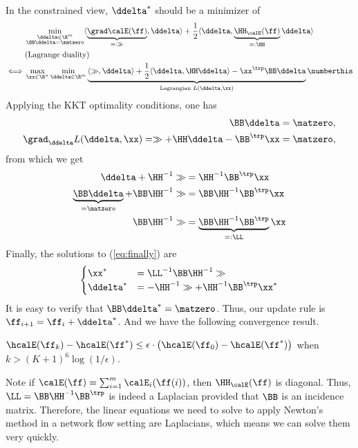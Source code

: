 In the constrained view, $\ddelta^*$ should be a minimizer of
\begin{align*}
  & \min_{\begin{subarray}{c} \ddelta\in\R^m \\ \BB\ddelta=\matzero \end{subarray}} \langle \underbrace{\grad\calE(\ff)}_{=:\gg},\ddelta\rangle + \frac{1}{2}\langle\ddelta,\underbrace{\HH_{\calE}(\ff)}_{=:\HH} \ddelta\rangle \\
  & \text{(Lagrange duality)} \\
  \iff & \max_{\xx\in\R^n} \min_{\ddelta\in\R^m} \underbrace{\langle\gg,\ddelta\rangle + \frac{1}{2}\langle\ddelta,\HH\ddelta\rangle - \xx^\trp\BB\ddelta}_{\text{Lagrangian } L(\ddelta,\xx)} \numberthis \label{eq:finally}
\end{align*}
Applying the KKT optimality conditions, one has
\begin{align*}
  \BB\ddelta = \matzero, \\
  \grad_{\ddelta} L(\ddelta,\xx) = \gg+ \HH\ddelta - \BB^\trp\xx = \matzero,
\end{align*}
from which we get
\begin{align*}
  \ddelta + \HH^{-1}\gg &= \HH^{-1}\BB^\trp\xx \\
  \underbrace{\BB\ddelta}_{=\matzero} + \BB\HH^{-1}\gg  &= \BB\HH^{-1}\BB^\trp\xx \\
  \BB\HH^{-1}\gg  &= \underbrace{\BB\HH^{-1}\BB^\trp}_{=:\LL}\xx
\end{align*}
Finally, the solutions to (\ref{eq:finally}) are
\[\begin{cases}
  \xx^* &= \LL^{-1}\BB\HH^{-1}\gg \\
  \ddelta^* &= -\HH^{-1}\gg + \HH^{-1}\BB^\trp\xx^*
\end{cases}\]
It is easy to verify that $\BB\ddelta^* = \matzero$. Thus, our update rule is $\ff_{i+1} = \ff_{i} + \ddelta^*$. And we have the following convergence result.
\begin{theorem}
  $\hcalE(\ff_k)-\hcalE(\ff^*) \leq \epsilon \cdot \big(\hcalE(\ff_0)-\hcalE(\ff^*)\big)$ when $k>(K+1)^6\log(1/\epsilon)$.
\end{theorem}

\begin{remark}
  Note if $\calE(\ff) = \sum_{i=1}^{m} \calE_{i}(\ff(i))$, then
  $\HH_{\calE}(\ff)$ is diagonal. Thus, $\LL=\BB\HH^{-1}\BB^\trp$ is
  indeed a Laplacian provided that $\BB$ is an incidence matrix.
  Therefore, the linear equations we need to solve to apply
  Newton's method in a network flow setting are Laplacians, which
  means we can solve them very quickly.
\end{remark}


%
